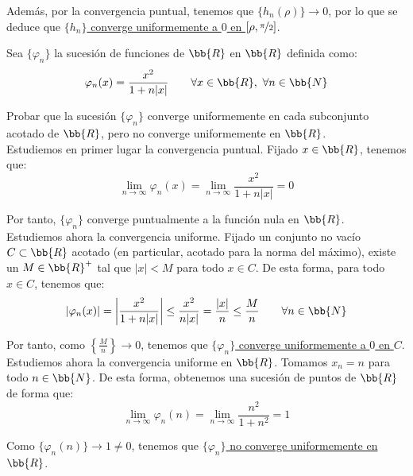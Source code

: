 \begin{ejercicio}
    Además, por la convergencia puntual, tenemos que $\{h_n(\rho)\}\to 0$, por lo que se deduce que \ul{$\{h_n\}$ converge uniformemente a $0$ en $[\rho,\nicefrac{\pi}{2}]$}.
\end{ejercicio}



\begin{ejercicio}
    Sea $\{\varphi_n\}$ la sucesión de funciones de $\bb{R}$ en $\bb{R}$ definida como:
    \begin{equation*}
        \varphi_n(x) = \frac{x^2}{1+n|x|} \qquad \forall x\in \bb{R},~\forall n\in \bb{N}
    \end{equation*}

    Probar que la sucesión $\{\varphi_n\}$ converge uniformemente en cada subconjunto acotado de $\bb{R}$, pero no converge uniformemente en $\bb{R}$.\\

    Estudiemos en primer lugar la convergencia puntual. Fijado $x\in \bb{R}$, tenemos que:
    \begin{equation*}
        \lim_{n\to \infty} \varphi_n(x) = \lim_{n\to \infty} \frac{x^2}{1+n|x|} = 0
    \end{equation*}

    Por tanto, $\{\varphi_n\}$ converge puntualmente a la función nula en $\bb{R}$.\\

    Estudiemos ahora la convergencia uniforme. Fijado un conjunto no vacío $C\subset \bb{R}$ acotado (en particular, acotado para la norma del máximo), existe un $M\in \bb{R}^+$ tal que $|x|<M$ para todo $x\in C$. De esta forma, para todo $x\in C$, tenemos que:
    \begin{equation*}
        |\varphi_n(x)| = \left|\frac{x^2}{1+n|x|}\right| \leq \frac{x^2}{n|x|} = \frac{|x|}{n} \leq \frac{M}{n} \qquad \forall n\in \bb{N}
    \end{equation*}

    Por tanto, como $\left\{\frac{M}{n}\right\}\to 0$, tenemos que \ul{$\{\varphi_n\}$ converge uniformemente a $0$ en $C$}.\\

    Estudiemos ahora la convergencia uniforme en $\bb{R}$. Tomamos $x_n=n$ para todo $n\in \bb{N}$. De esta forma, obtenemos una sucesión de puntos de $\bb{R}$ de forma que:
    \begin{equation*}
        \lim_{n\to \infty} \varphi_n(n) = \lim_{n\to \infty} \frac{n^2}{1+n^2} = 1
    \end{equation*}

    Como $\{\varphi_n(n)\}\to 1\neq 0$, tenemos que \ul{$\{\varphi_n\}$ no converge uniformemente en $\bb{R}$}.
\end{ejercicio}


